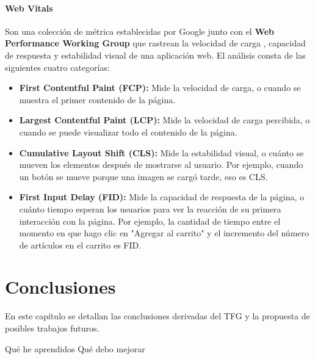 \documentclass[12pt,twoside,titlepage]{report}
\newcommand\blankpage{%
    \newpage
    \null
    \thispagestyle{empty}%
    \newpage}
\begin{document}
\subsubsection{Web Vitals}

Son una colección de métrica establecidas por Google \cite{webdev} junto con el \textbf{Web Performance Working Group} \cite{w3} que rastrean la velocidad de carga , capacidad de respuesta y estabilidad visual de una aplicación web. El análisis consta de las siguientes cuatro categorías:

\begin{itemize}
    \item\textbf{First Contentful Paint (FCP):} Mide la velocidad de carga, o cuando se muestra el primer contenido de la página.
    \item\textbf{Largest Contentful Paint (LCP):} Mide la velocidad de carga percibida, o cuando se puede visualizar todo el contenido de la página.
    \item\textbf{Cumulative Layout Shift (CLS):} Mide la estabilidad visual, o cuánto se mueven los elementos después de mostrarse al usuario. Por ejemplo, cuando un botón se mueve porque una imagen se cargó tarde, eso es CLS.
    \item\textbf{First Input Delay (FID):} Mide la capacidad de respuesta de la página, o cuánto tiempo esperan los usuarios para ver la reacción de su primera interacción con la página. Por ejemplo, la cantidad de tiempo entre el momento en que hago clic en "Agregar al carrito" y el incremento del número de artículos en el carrito es FID.
\end{itemize}

\newpage

\chapter{Conclusiones}

En este capítulo se detallan las conclusiones derivadas del TFG y la propuesta de posibles trabajos futuros.

Qué he aprendidos
Qué debo mejorar

\blankpage




{}
\footnotesize{
%


}
\raggedbottom
\afterpage{\blankpage}
\newpage
\end{document}
